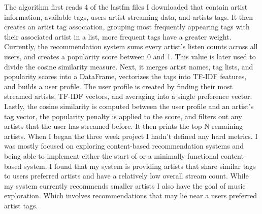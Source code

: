 \documentclass[10pt,twocolumn]{article}
\begin{document}
\indent The algorithm first reads 4 of the lastfm files I downloaded that contain artist information, available tags, users artist streaming data, and artists tags. It then creates an artist tag association, grouping most frequently appearing tags with their associated artist in a list, more frequent tags have a greater weight. Currently, the recommendation system sums every artist's listen counts across all users, and creates a popularity score between 0 and 1. This value is later used to divide the cosine similarity measure. Next, it merges artist names, tag lists, and popularity scores into a DataFrame, vectorizes the tags into TF-IDF features, and builds a user profile. The user profile is created by finding their most streamed artists, TF-IDF vectors, and averaging into a single preference vector. Lastly, the cosine similarity is computed between the user profile and an artist's tag vector, the popularity penalty is applied to the score, and filters out any artists that the user has streamed before. It then prints the top N remaining artists. When I began the three week project I hadn't defined any hard metrics. I was mostly focused on exploring content-based recommendation systems and being able to implement either the start of or a minimally functional content-based system. I found that my system is providing artists that share similar tags to users preferred artists and have a relatively low overall stream count. While my system currently recommends smaller artists I also have the goal of music exploration. Which involves recommendations that may lie near a users preferred artist tags. 
\end{document}
